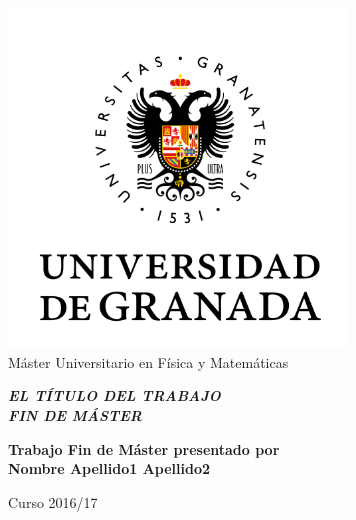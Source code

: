 
\thispagestyle{empty}


\begin{center}

\includegraphics[width=9cm]{simbolo_color.png}\\[2cm]
{\Large\sffamily M\'aster Universitario en F\'isica y Matem\'aticas}\\[3mm]


\vspace{2cm}


\begin{Large}
{\slshape\bfseries  EL T\'ITULO DEL TRABAJO\\[6mm]
FIN DE M\'ASTER}
\end{Large}

\vspace{2cm}

\vfill

\begin{large}
{\bf Trabajo Fin de M\'aster presentado por \\[3mm]
Nombre Apellido1 Apellido2}
\end{large}


\vspace{1.5cm}

\begin{Large}
Curso 2016/17
\end{Large}
\end{center}





